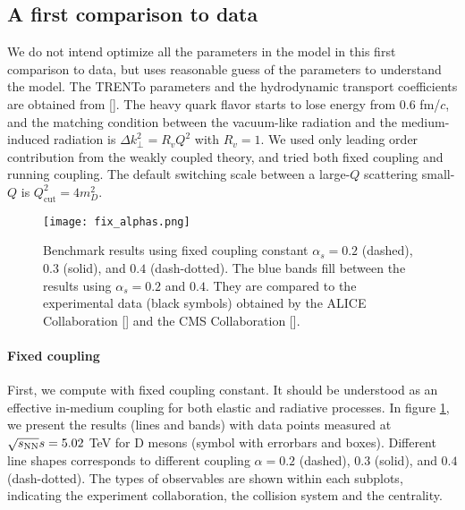\subsection{A first comparison to data}
We do not intend optimize all the parameters in the model in this first comparison to data, but uses reasonable guess of the parameters to understand the model.
The TRENTo parameters and the hydrodynamic transport coefficients are obtained from [].
The heavy quark flavor starts to lose energy from $0.6$ fm/$c$, and the matching condition between the vacuum-like radiation and the medium-induced radiation is $\Delta k_\perp^2 = R_v Q^2$ with $R_v = 1$.
We used only leading order contribution from the weakly coupled theory, and tried both fixed coupling and running coupling.
The default switching scale between a large-$Q$ scattering small-$Q$ is $Q_{\textrm{cut}}^2 = 4 m_D^2$.

\begin{figure}
\centering
\texttt{[image: fix\_alphas.png]}
\caption{Benchmark results using fixed coupling constant $\alpha_s = 0.2$ (dashed), $0.3$ (solid), and $0.4$ (dash-dotted). The blue bands fill between the results using $\alpha_s=0.2$ and $0.4$. They are compared to the experimental data (black symbols) obtained by the ALICE Collaboration [] and the CMS Collaboration [].}
\label{fig:new:fix-a}
\end{figure}

\paragraph{Fixed coupling} First, we compute with fixed coupling constant.
It should be understood as an effective in-medium coupling for both elastic and radiative processes.
In figure \ref{fig:new:fix-a}, we present the results (lines and bands) with data points measured at $\sqrt{s_\mathrm{NN}}{s} = 5.02$ TeV for D mesons (symbol with errorbars and boxes).
Different line shapes corresponds to different coupling $\alpha=0.2$ (dashed), $0.3$ (solid), and $0.4$ (dash-dotted). 
The types of observables are shown within each subplots, indicating the experiment collaboration, the collision system and the centrality.

